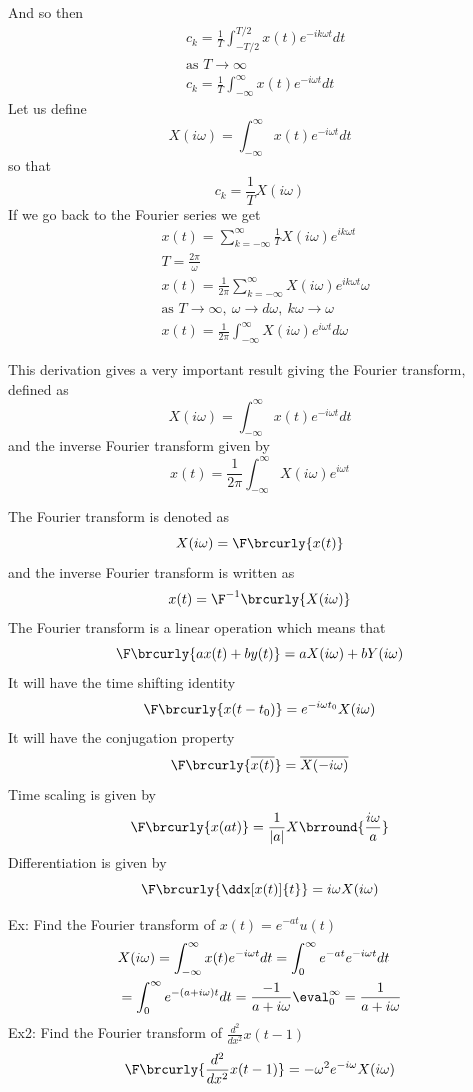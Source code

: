 And so then
\begin{align*}
    &c_k=\frac{1}{T}\int_{-T/2}^{T/2}x(t)e^{-ik\omega t}dt\\
    &\text{as }T\to\infty\\
    &c_k=\frac{1}{T}\int_{-\infty}^\infty x(t)e^{-i\omega t}dt
\end{align*}
Let us define
$$X(i\omega)=\int_{-\infty}^\infty x(t)e^{-i\omega t}dt$$
so that
$$c_k=\frac{1}{T}X(i\omega)$$
If we go back to the Fourier series we get
\begin{align*}
    &x(t)=\sum_{k=-\infty}^\infty \frac{1}{T}X(i\omega)e^{ik\omega t}\\
    &T=\frac{2\pi}{\omega}\\
    &x(t)=\frac{1}{2\pi}\sum_{k=-\infty}^\infty X(i\omega)e^{ik\omega t}\omega\\
    &\text{as }T\to\infty,\ \omega\to d\omega,\ k\omega\to \omega\\
    &x(t)=\frac{1}{2\pi}\int_{-\infty}^\infty X(i\omega)e^{i\omega t}d\omega
\end{align*}

This derivation gives a very important result giving the Fourier transform, defined as
$$\boxed{X(i\omega)=\int_{-\infty}^\infty x(t)e^{-i\omega t}dt}$$
and the inverse Fourier transform given by
$$\boxed{x(t)=\frac{1}{2\pi}\int_{-\infty}^\infty X(i\omega)e^{i\omega t}}$$

The Fourier transform is denoted as
$$X(i\omega)=\F\brcurly{x(t)}$$
and the inverse Fourier transform is written as
$$x(t)=\F^{-1}\brcurly{X(i\omega)}$$
The Fourier transform is a linear operation which means that
$$\F\brcurly{ax(t)+by(t)}=aX(i\omega)+bY(i\omega)$$
It will have the time shifting identity
$$\F\brcurly{x(t-t_0)}=e^{-i\omega t_0}X(i\omega)$$
It will have the conjugation property
$$\F\brcurly{\overline{x(t)}}=\overline{X(-i\omega)}$$
Time scaling is given by
$$\F\brcurly{x(at)}=\frac{1}{|a|}X\brround{\frac{i\omega}{a}}$$
Differentiation is given by
$$\F\brcurly{\ddx[x(t)]{t}}=i\omega X(i\omega)$$

Ex: Find the Fourier transform of $x(t)=e^{-at}u(t)$
\begin{align*}
    &X(i\omega)=\int_{-\infty}^\infty x(t)e^{-i\omega t}dt=\int_0^\infty e^{-at}e^{-i\omega t}dt\\
    &=\int_0^\infty e^{-(a+i\omega)t}dt=\frac{-1}{a+i\omega}\eval_0^\infty=\frac{1}{a+i\omega}
\end{align*}
Ex2: Find the Fourier transform of $\frac{d^2}{dx^2}x(t-1)$
\[ \F\brcurly{\frac{d^2}{dx^2}x(t-1)}=-\omega^2e^{-i\omega}X(i\omega) \]


